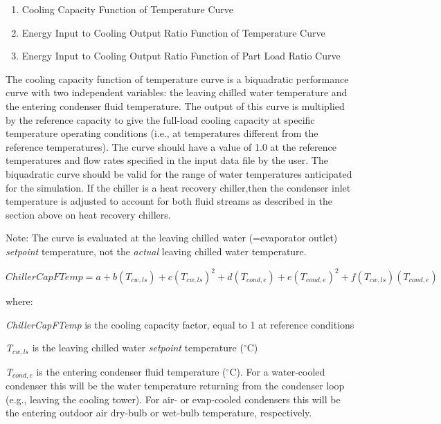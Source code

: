 \begin{enumerate}
\item Cooling Capacity Function of Temperature Curve
\item Energy Input to Cooling Output Ratio Function of Temperature Curve
\item Energy Input to Cooling Output Ratio Function of Part Load Ratio Curve
\end{enumerate}

The cooling capacity function of temperature curve is a biquadratic performance curve with two independent variables: the leaving chilled water temperature and the entering condenser fluid temperature. The output of this curve is multiplied by the reference capacity to give the full-load cooling capacity at specific temperature operating conditions (i.e., at temperatures different from the reference temperatures). The curve should have a value of 1.0 at the reference temperatures and flow rates specified in the input data file by the user. The biquadratic curve should be valid for the range of water temperatures anticipated for the simulation. If the chiller is a heat recovery chiller,then the condenser inlet temperature is adjusted to account for both fluid streams as described in the section above on heat recovery chillers.

Note: The curve is evaluated at the leaving chilled water (=evaporator outlet) \emph{setpoint} temperature, not the \emph{actual} leaving chilled water temperature.

\begin{equation}
ChillerCapFTemp = a + b\left( {{T_{cw,ls}}} \right) + c{\left( {{T_{cw,ls}}} \right)^2} + d\left( {{T_{cond,e}}} \right) + e{\left( {{T_{cond,e}}} \right)^2} + f\left( {{T_{cw,ls}}} \right)\left( {{T_{cond,e}}} \right)
\end{equation}

where:

\emph{ChillerCapFTemp} is the cooling capacity factor, equal to 1 at reference conditions

\emph{T\(_{cw,ls}\)} is the leaving chilled water \emph{setpoint} temperature (\(^{\circ}\)C)

\emph{T\(_{cond,e}\)} is the entering condenser fluid temperature (\(^{\circ}\)C). For a water-cooled condenser this will be the water temperature returning from the condenser loop (e.g., leaving the cooling tower). For air- or evap-cooled condensers this will be the entering outdoor air dry-bulb or wet-bulb temperature, respectively.

